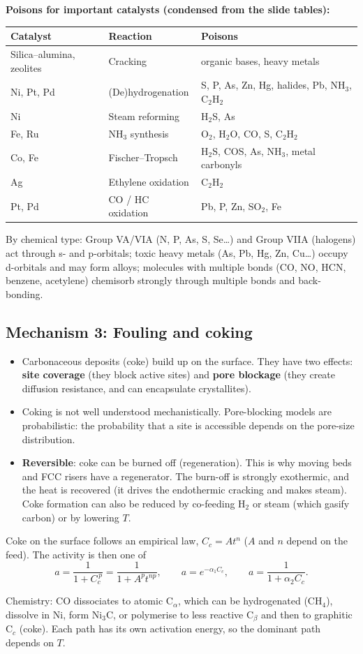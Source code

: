 \documentclass[11pt]{article}
\begin{document}
\textbf{Poisons for important catalysts (condensed from the slide tables):}
\begin{center}
\small
\renewcommand{\arraystretch}{1.15}
\begin{tabular}{lll}
\toprule
Catalyst & Reaction & Poisons\\
\midrule
Silica--alumina, zeolites & Cracking & organic bases, heavy metals\\
Ni, Pt, Pd & (De)hydrogenation & S, P, As, Zn, Hg, halides, Pb, NH$_3$, C$_2$H$_2$\\
Ni & Steam reforming & H$_2$S, As\\
Fe, Ru & NH$_3$ synthesis & O$_2$, H$_2$O, CO, S, C$_2$H$_2$\\
Co, Fe & Fischer--Tropsch & H$_2$S, COS, As, NH$_3$, metal carbonyls\\
Ag & Ethylene oxidation & C$_2$H$_2$\\
Pt, Pd & CO / HC oxidation & Pb, P, Zn, SO$_2$, Fe\\
\bottomrule
\end{tabular}
\end{center}
By chemical type: Group VA/VIA (N, P, As, S, Se\ldots) and Group VIIA (halogens) act through s- and p-orbitals;
toxic heavy metals (As, Pb, Hg, Zn, Cu\ldots) occupy d-orbitals and may form alloys; molecules with multiple bonds
(CO, NO, HCN, benzene, acetylene) chemisorb strongly through multiple bonds and back-bonding.

\subsection{Mechanism 3: Fouling and coking}
\begin{itemize}
\item Carbonaceous deposits (coke) build up on the surface. They have two effects: \textbf{site coverage} (they block active sites) and
\textbf{pore blockage} (they create diffusion resistance, and can encapsulate crystallites).
\item Coking is not well understood mechanistically. Pore-blocking models are probabilistic: the probability that a
site is accessible depends on the pore-size distribution.
\item \textbf{Reversible}: coke can be burned off (regeneration). This is why moving beds and FCC risers have a regenerator.
The burn-off is strongly exothermic, and the heat is recovered (it drives the endothermic cracking and makes steam).
Coke formation can also be reduced by co-feeding H$_2$ or steam (which gasify carbon) or by lowering $T$.
\end{itemize}
\begin{keyresult}[Coking]
Coke on the surface follows an empirical law, $C_c=At^n$ ($A$ and $n$ depend on the feed). The activity is then one of
\[
a=\frac{1}{1+C_c^{\,p}}=\frac{1}{1+A^pt^{np}},\qquad
a=e^{-\alpha_1C_c},\qquad
a=\frac{1}{1+\alpha_2C_c}.
\]
\end{keyresult}
Chemistry: CO dissociates to atomic C$_\alpha$, which can be hydrogenated (CH$_4$), dissolve in Ni, form Ni$_3$C, or
polymerise to less reactive C$_\beta$ and then to graphitic C$_c$ (coke). Each path has its own activation energy, so
the dominant path depends on $T$.
\end{document}
